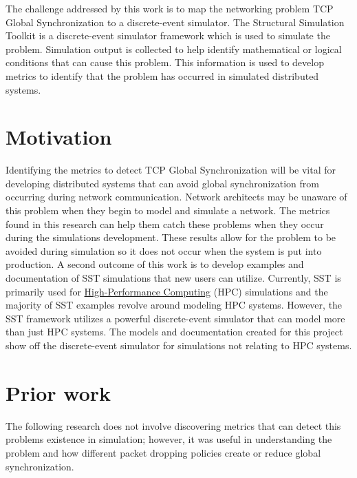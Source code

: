 \documentclass{article}
\begin{document}
The challenge addressed by this work is to map the networking problem TCP Global Synchronization to a discrete-event simulator. The Structural Simulation Toolkit is a discrete-event simulator framework which is used to simulate the problem. Simulation output is collected to help identify mathematical or logical conditions that can cause this problem. This information is used to develop metrics to identify that the problem has occurred in simulated distributed systems. 


\section{Motivation} %

Identifying the metrics to detect TCP Global Synchronization will be vital for developing distributed systems that can avoid global synchronization from occurring during network communication. Network architects may be unaware of this problem when they begin to model and simulate a network. The metrics found in this research can help them catch these problems when they occur during the simulations development. These results allow for the problem to be avoided during simulation so it does not occur when the system is put into production.
A second outcome of this work is to develop examples and documentation of SST simulations that new users can utilize. Currently, SST is primarily used for \href{https://en.wikipedia.org/wiki/High-performance_computing}{High-Performance Computing} (HPC) simulations and the majority of SST examples revolve around modeling HPC systems. However, the SST framework utilizes a powerful discrete-event simulator that can model more than just HPC systems. The models and documentation created for this project show off the discrete-event simulator for simulations not relating to HPC systems.

\section{Prior work} %
The following research does not involve discovering metrics that can detect this problems existence in simulation; however, it was useful in understanding the problem and how different packet dropping policies create or reduce global synchronization. \cite{Bashi2017}
\end{document}
